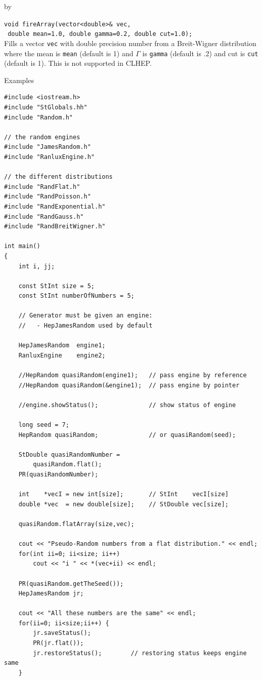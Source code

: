 \documentclass[twoside]{article}
\newcommand{\comp}[1]{\texttt{#1}}%
\newcommand{\entrylabel}[1]{\mbox{\textbf{{#1}}}\hfil}%
\newenvironment{entry}
{\begin{list}{}%
    {\renewcommand{\makelabel}{\entrylabel}%
     \setlength{\labelwidth}{90pt}%
     \setlength{\leftmargin}{\labelwidth}
     \advance\leftmargin by \labelsep%
      }%
    }%
  {\end{list}}
\newcommand{\Entrylabel}[1]%
{\raisebox{0pt}[1ex][0pt]{\makebox[\labelwidth][l]%
    {\parbox[t]{\labelwidth}{\hspace{0pt}\textbf{{#1}}}}}}
\newenvironment{Entry}%
{\renewcommand{\entrylabel}{\Entrylabel}\begin{entry}}%
  {\end{entry}}
\begin{document}
\begin{description}
\begin{Entry}
    \verb+void fireArray(vector<double>& vec,+\\
    \verb+ double mean=1.0, double gamma=0.2, double cut=1.0);+\\
    Fills a vector \comp{vec} with double
    precision number from a Breit-Wigner
    distribution where the mean is \comp{mean} (default is 1)
    and $\Gamma$ is \comp{gamma} (default is .2) and cut is
    \comp{cut} (default is 1).  This is not supported in CLHEP.
    
     
\item[Examples]
{\footnotesize
\begin{verbatim}
#include <iostream.h>
#include "StGlobals.hh"
#include "Random.h"

// the random engines
#include "JamesRandom.h"
#include "RanluxEngine.h"

// the different distributions
#include "RandFlat.h"
#include "RandPoisson.h"
#include "RandExponential.h"
#include "RandGauss.h"
#include "RandBreitWigner.h"

int main()
{
    int i, jj;
    
    const StInt size = 5;
    const StInt numberOfNumbers = 5;
    
    // Generator must be given an engine:
    //   - HepJamesRandom used by default

    HepJamesRandom  engine1;
    RanluxEngine    engine2;
    
    //HepRandom quasiRandom(engine1);   // pass engine by reference
    //HepRandom quasiRandom(&engine1);  // pass engine by pointer

    //engine.showStatus();              // show status of engine
    
    long seed = 7;
    HepRandom quasiRandom;              // or quasiRandom(seed);
    
    StDouble quasiRandomNumber =
        quasiRandom.flat();
    PR(quasiRandomNumber);

    int    *vecI = new int[size];       // StInt    vecI[size]
    double *vec  = new double[size];    // StDouble vec[size];
    
    quasiRandom.flatArray(size,vec);

    cout << "Pseudo-Random numbers from a flat distribution." << endl;
    for(int ii=0; ii<size; ii++)
        cout << "i " << *(vec+ii) << endl;
        
    PR(quasiRandom.getTheSeed());
    HepJamesRandom jr;

    cout << "All these numbers are the same" << endl;
    for(ii=0; ii<size;ii++) {
        jr.saveStatus();
        PR(jr.flat());
        jr.restoreStatus();        // restoring status keeps engine same
    }


\end{verbatim}}
\end{Entry}
\end{description}
\end{document}
